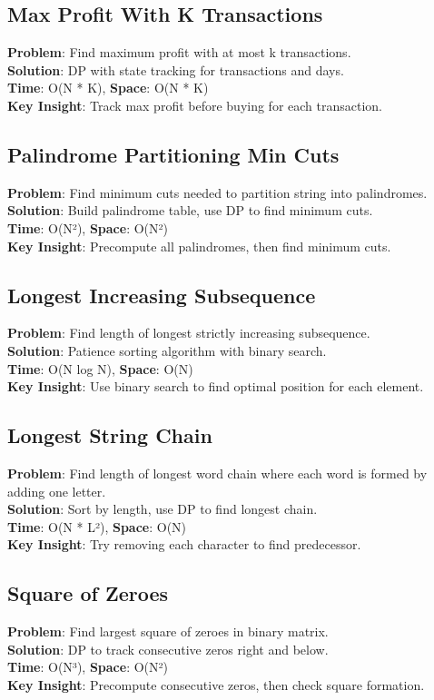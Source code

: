 \documentclass{report}
\begin{document}
\subsection{Max Profit With K Transactions}
\textbf{Problem}: Find maximum profit with at most k transactions.\\
\textbf{Solution}: DP with state tracking for transactions and days.\\
\textbf{Time}: O(N * K), \textbf{Space}: O(N * K)\\
\textbf{Key Insight}: Track max profit before buying for each transaction.

\subsection{Palindrome Partitioning Min Cuts}
\textbf{Problem}: Find minimum cuts needed to partition string into palindromes.\\
\textbf{Solution}: Build palindrome table, use DP to find minimum cuts.\\
\textbf{Time}: O(N²), \textbf{Space}: O(N²)\\
\textbf{Key Insight}: Precompute all palindromes, then find minimum cuts.

\subsection{Longest Increasing Subsequence}
\textbf{Problem}: Find length of longest strictly increasing subsequence.\\
\textbf{Solution}: Patience sorting algorithm with binary search.\\
\textbf{Time}: O(N log N), \textbf{Space}: O(N)\\
\textbf{Key Insight}: Use binary search to find optimal position for each element.

\subsection{Longest String Chain}
\textbf{Problem}: Find length of longest word chain where each word is formed by adding one letter.\\
\textbf{Solution}: Sort by length, use DP to find longest chain.\\
\textbf{Time}: O(N * L²), \textbf{Space}: O(N)\\
\textbf{Key Insight}: Try removing each character to find predecessor.

\subsection{Square of Zeroes}
\textbf{Problem}: Find largest square of zeroes in binary matrix.\\
\textbf{Solution}: DP to track consecutive zeros right and below.\\
\textbf{Time}: O(N³), \textbf{Space}: O(N²)\\
\textbf{Key Insight}: Precompute consecutive zeros, then check square formation.
\end{document}
